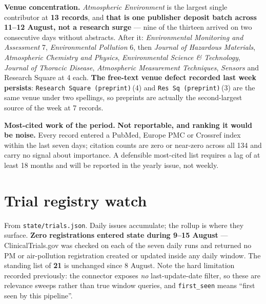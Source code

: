 \documentclass[10pt]{article}
\begin{document}
\vspace{2mm}
\textbf{Venue concentration.} \textit{Atmospheric Environment} is the largest single
contributor at \textbf{13 records}, and \textbf{that is one publisher deposit batch across
11--12 August, not a research surge} --- nine of the thirteen arrived on two consecutive
days without abstracts. After it: \textit{Environmental Monitoring and Assessment} 7,
\textit{Environmental Pollution} 6, then \textit{Journal of Hazardous Materials},
\textit{Atmospheric Chemistry and Physics}, \textit{Environmental Science \& Technology},
\textit{Journal of Thoracic Disease}, \textit{Atmospheric Measurement Techniques},
\textit{Sensors} and Research Square at 4 each. \textbf{The free-text venue defect
recorded last week persists}: \texttt{Research Square (preprint)}\,(4) and
\texttt{Res Sq (preprint)}\,(3) are the same venue under two spellings, so preprints are
actually the second-largest source of the week at 7 records.

\vspace{2mm}
\textbf{Most-cited work of the period.} \textbf{Not reportable, and ranking it would be
noise.} Every record entered a PubMed, Europe PMC or Crossref index within the last seven
days; citation counts are zero or near-zero across all 134 and carry no signal about
importance. A defensible most-cited list requires a lag of at least 18 months and will be
reported in the yearly issue, not weekly.

\vspace{4mm}

\section*{\sffamily\bfseries\color{Deep}Trial registry watch}
\vspace{-1.5mm}{\color{Teal}\rule{\linewidth}{1.1pt}}\vspace{2.5mm}

{\fontsize{7.4}{9}\selectfont\color{Slate}From \texttt{state/trials.json}. Daily issues
accumulate; the rollup is where they surface. \textbf{Zero registrations entered state
during 9--15 August} --- ClinicalTrials.gov was checked on each of the seven daily runs and
returned no PM or air-pollution registration created or updated inside any daily window.
The standing list of \textbf{21} is unchanged since 8 August. Note the hard limitation
recorded previously: the connector exposes \emph{no} last-update-date filter, so these are
relevance sweeps rather than true window queries, and \texttt{first\_seen} means ``first
seen by this pipeline''.\par}
\end{document}
